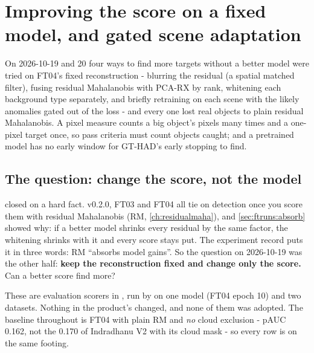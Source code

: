 \chapter{Improving the score on a fixed model, and gated scene adaptation}\label{ch:scoringgains}
\begingroup\sloppy %

\begin{onething}
On 2026-10-19 and 20 four ways to find more targets without a better model were tried on FT04's fixed reconstruction -
blurring the residual (a spatial matched filter), fusing residual Mahalanobis with PCA-RX by rank, whitening each
background type separately, and briefly retraining on each scene with the likely anomalies gated out of the loss - and
every one lost real objects to plain residual Mahalanobis. A pixel measure counts a big object's pixels many times and
a one-pixel target once, so pass criteria must count objects caught; and a pretrained model has no early window for
GT-HAD's early stopping to find.
\end{onething}

\section{The question: change the score, not the model}\label{sec:scoringgains:question}

 closed on a hard fact. v0.2.0, FT03 and FT04 all tie on detection once you score them with residual
Mahalanobis (RM, \cref{ch:residualmaha}), and \cref{sec:ftruns:absorb} showed why: if a better model shrinks every
residual by the same factor, the whitening shrinks with it and every score stays put. The experiment record puts it in
three words: RM ``absorbs model gains''. So the question on 2026-10-19 was the other half: \textbf{keep the
reconstruction fixed and change only the score.} Can a better score find more?

These are evaluation scorers in , run by  on one
model (FT04 epoch 10) and two datasets. Nothing in the product's  changed, and none of them was
adopted. The baseline throughout is FT04 with plain RM and \emph{no} cloud exclusion - pAUC 0.162, not the 0.170 of
Indradhanu V2 with its cloud mask - so every row is on the same footing.

